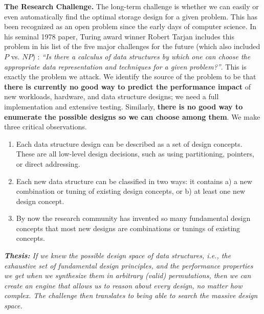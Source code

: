\documentclass[11pt]{article}
\begin{document}
\textbf{The Research Challenge.}
The long-term challenge is whether we can easily or even automatically find the optimal storage design for a given problem. This has been recognized as an open problem since the early days of computer science. In his seminal 1978 paper, Turing award winner Robert Tarjan includes this problem in his list of the five major challenges for the future (which also included $P$ vs. $NP$) \cite{Tarjan1978}: \textit{``Is there a calculus of data structures by which one can choose the appropriate data representation and techniques for a given problem?''}. This is exactly the problem we attack. We identify the source of the problem to be that \textbf{there is currently no good way to predict the performance impact} of new workloads, hardware, and data structure designs; we need a full implementation and extensive testing. Similarly, \textbf{there is no good way to enumerate the possible designs so we can choose among them}. We make three critical observations.
\vspace{-.5em}
\begin{enumerate}
	\item Each data structure design can be described as a set of design concepts. These are all low-level design decisions, such as using partitioning, pointers, or direct addressing.
	\vspace{-.5em}
	\item Each new data structure can be classified in two ways: it contains a) a new combination or tuning of existing design concepts, or b) at least one new design concept.
	\vspace{-.5em}
	\item By now the research community has invented so many fundamental design concepts that most new designs are combinations or tunings of existing concepts.
\end{enumerate}
\vspace{-.5em}
\emph{\textbf{Thesis:} If we knew the possible design space of data structures, i.e., the exhaustive set of fundamental design principles, and the performance properties we get when we synthesize them in arbitrary (valid) permutations, then we can create an engine that allows us to reason about every design, no matter how complex. The challenge then translates to being able to search the massive design space.}

\vspace{.5em} 
\end{document}
